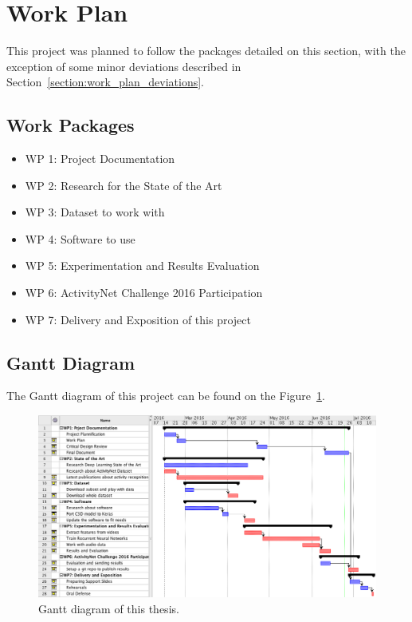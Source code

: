 \section{Work Plan}

This project was planned to follow the packages detailed on this section, with the exception of some minor deviations described in Section~\ref{section:work_plan_deviations}.

\subsection{Work Packages}

\begin{itemize}
    \item WP 1: Project Documentation
    \item WP 2: Research for the State of the Art
    \item WP 3: Dataset to work with
    \item WP 4: Software to use
    \item WP 5: Experimentation and Results Evaluation
    \item WP 6: ActivityNet Challenge 2016 Participation
    \item WP 7: Delivery and Exposition of this project
\end{itemize}

\subsection{Gantt Diagram}

The Gantt diagram of this project can be found on the Figure~\ref{fig:gantt_diagram}.

\begin{figure}[H]
\begin{center}
\includegraphics[width=1\linewidth]{img/introduction/gantt_diagram}
\end{center}
\caption{Gantt diagram of this thesis.}
\label{fig:gantt_diagram}
\end{figure}

